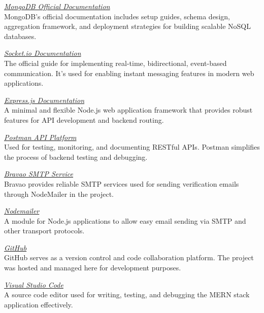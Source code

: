 \documentclass[12pt,a4paper]{report}
\begin{document}
\begin{thebibliography}{9}
\begin{thebibliography}{9}
\textit{\href{https://www.mongodb.com/docs/}{MongoDB Official Documentation}}\\
MongoDB's official documentation includes setup guides, schema design, aggregation framework, and deployment strategies for building scalable NoSQL databases.

\textit{\href{https://socket.io/docs/v4/}{Socket.io Documentation}}\\
The official guide for implementing real-time, bidirectional, event-based communication. It’s used for enabling instant messaging features in modern web applications.

\textit{\href{https://expressjs.com/}{Express.js Documentation}}\\
A minimal and flexible Node.js web application framework that provides robust features for API development and backend routing.

\textit{\href{https://www.postman.com/}{Postman API Platform}}\\
Used for testing, monitoring, and documenting RESTful APIs. Postman simplifies the process of backend testing and debugging.

\textit{\href{https://www.bravowsmtp.com/}{Bravao SMTP Service}}\\
Bravao provides reliable SMTP services used for sending verification emails through NodeMailer in the project.

\textit{\href{https://nodemailer.com/about/}{Nodemailer}}\\
A module for Node.js applications to allow easy email sending via SMTP and other transport protocols.

\textit{\href{https://github.com/}{GitHub}}\\
GitHub serves as a version control and code collaboration platform. The project was hosted and managed here for development purposes.

\textit{\href{https://code.visualstudio.com/}{Visual Studio Code}}\\
A source code editor used for writing, testing, and debugging the MERN stack application effectively.

\end{thebibliography}









\newpage




\end{thebibliography}
\end{document}
